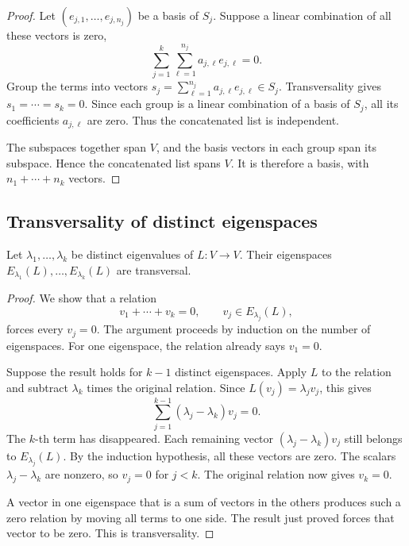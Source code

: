 \begin{proof}
  Let \((e_{j,1},\ldots,e_{j,n_j})\) be a basis of \(S_j\).
  Suppose a linear combination of all these vectors is zero,
  \[
    \sum_{j=1}^k\sum_{\ell=1}^{n_j}a_{j,\ell}e_{j,\ell}=0.
  \]
  Group the terms into vectors
  \(s_j=\sum_{\ell=1}^{n_j}a_{j,\ell}e_{j,\ell}\in S_j\).
  Transversality gives \(s_1=\cdots=s_k=0\). Since each group is a
  linear combination of a basis of \(S_j\), all its coefficients
  \(a_{j,\ell}\) are zero. Thus the concatenated list is independent.

  The subspaces together span \(V\), and the basis vectors in each
  group span its subspace. Hence the concatenated list spans \(V\).
  It is therefore a basis, with \(n_1+\cdots+n_k\) vectors.
\end{proof}

\subsection{Transversality of distinct eigenspaces}

\begin{theorem}
  \label{thm:linear-algebra-i:distinct-eigenspaces-transversal}
  Let \(\lambda_1,\ldots,\lambda_k\) be distinct eigenvalues of
  \(L:V\to V\). Their eigenspaces
  \(E_{\lambda_1}(L),\ldots,E_{\lambda_k}(L)\) are transversal.
\end{theorem}

\begin{proof}
  We show that a relation
  \[
    v_1+\cdots+v_k=0,\qquad v_j\in E_{\lambda_j}(L),
  \]
  forces every \(v_j=0\). The argument proceeds by induction on the
  number of eigenspaces. For one eigenspace, the relation already says
  \(v_1=0\).

  Suppose the result holds for \(k-1\) distinct eigenspaces. Apply
  \(L\) to the relation and subtract \(\lambda_k\) times the original
  relation. Since \(L(v_j)=\lambda_jv_j\), this gives
  \[
    \sum_{j=1}^{k-1}(\lambda_j-\lambda_k)v_j=0.
  \]
  The \(k\)-th term has disappeared. Each remaining vector
  \((\lambda_j-\lambda_k)v_j\) still belongs to \(E_{\lambda_j}(L)\).
  By the induction hypothesis, all these vectors are zero. The scalars
  \(\lambda_j-\lambda_k\) are nonzero, so \(v_j=0\) for \(j<k\).
  The original relation now gives \(v_k=0\).

  A vector in one eigenspace that is a sum of vectors in the others
  produces such a zero relation by moving all terms to one side.
  The result just proved forces that vector to be zero. This is
  transversality.
\end{proof}

